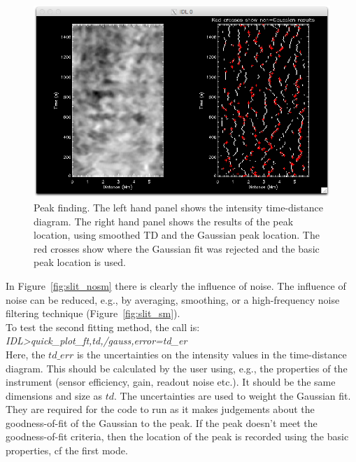 \documentclass{article}
\begin{document}
\begin{figure}[!tp]
\centering

\includegraphics[scale=0.6, clip=true, viewport=0.5cm 0.cm 25.cm 16.7cm]{slit_gauss.png}  

\caption{Peak finding. The left hand panel shows the intensity time-distance diagram. The right hand panel shows the results of the peak location, using smoothed TD and the Gaussian peak location. The red crosses show where the Gaussian fit was rejected and the basic peak location is used.
}\label{fig:slit_g}
\end{figure}

In Figure~\ref{fig:slit_nosm} there is clearly the influence of noise. The influence of noise can be reduced, e.g., by averaging, smoothing, or a high-frequency noise filtering 
technique (Figure~\ref{fig:slit_sm}). \\

To test the second fitting method, the call is: \\

\textit{IDL\textgreater quick\_plot\_ft,td,/gauss,error=td\_er} \\

Here, the $td\_err$ is the uncertainties on the intensity values in the time-distance diagram. This should be calculated by 
the user using, e.g., the properties of the instrument (sensor efficiency, gain, readout noise etc.). It should be the same 
dimensions and size as $td$. The uncertainties are used 
to weight the Gaussian fit. They are required for the code to run as it makes judgements about the goodness-of-fit of the Gaussian to the peak. If the peak doesn't meet the goodness-of-fit criteria, then the location of the peak is recorded using the 
basic properties, cf the first mode.\\
\end{document}
